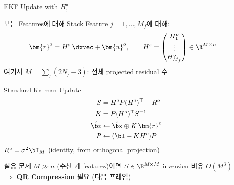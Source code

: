 \begin{frame}[shrink=10]{EKF Update with $H_j^o$}
  \begin{block}{모든 Features에 대해 Stack}
    Feature $j = 1,\ldots,M_f$에 대해:
    \begin{align*}
      \bm{r}^o &= H^o\,\dxvec + \bm{n}^o, \qquad
      H^o = \begin{pmatrix}H_1^o \\ \vdots \\ H_{M_f}^o\end{pmatrix}
      \in \R^{M\times n}
    \end{align*}
    여기서 $M = \sum_j (2N_j - 3)$: 전체 projected residual 수
  \end{block}
  \begin{block}{Standard Kalman Update}
    \begin{align*}
      S &= H^o P (H^o)^\top + R^o \\
      K &= P (H^o)^\top S^{-1} \\
      \hat{\bx} &\leftarrow \hat{\bx} \oplus K\,\bm{r}^o \\
      P &\leftarrow (\bI - K H^o) P
    \end{align*}
    $R^o = \sigma^2 \bI_M$ (identity, from orthogonal projection)
  \end{block}
  \begin{alertblock}{실용 문제}
    $M \gg n$ (수천 개 features)이면 $S \in \R^{M\times M}$ inversion 비용 $O(M^3)$ \\
    $\Rightarrow$ \textbf{QR Compression} 필요 (다음 프레임)
  \end{alertblock}
\end{frame}

